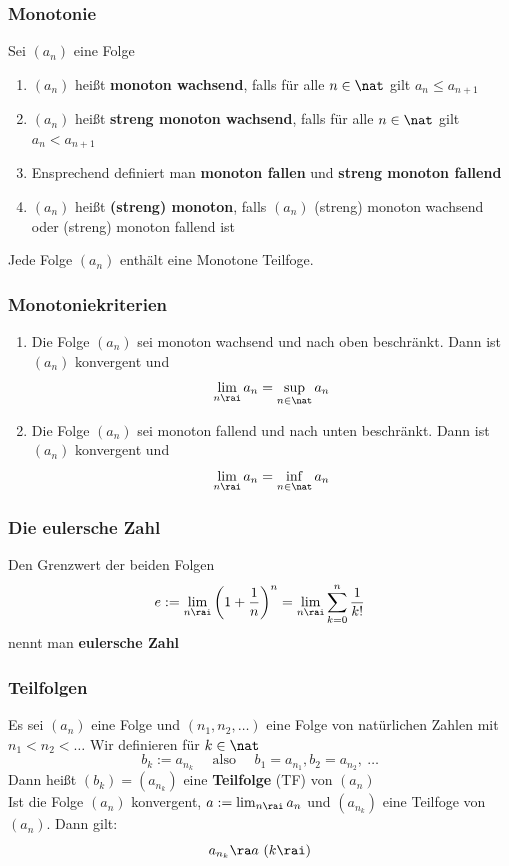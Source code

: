 \documentclass{kit}
\begin{document}
    \subsubsection{Monotonie}
      Sei $(a_n)$ eine Folge
      \begin{enumerate}
        \item $(a_n)$ heißt \textbf{monoton wachsend}, falls für alle $n\in\nat$ gilt $a_n\le a_{n+1}$
        \item $(a_n)$ heißt \textbf{streng monoton wachsend}, falls für alle $n\in\nat$ gilt $a_n<a_{n+1}$
        \item Ensprechend definiert man \textbf{monoton fallen} und \textbf{streng monoton fallend}
        \item $(a_n)$ heißt \textbf{(streng) monoton}, falls $(a_n)$ (streng) monoton wachsend oder (streng) monoton fallend ist
      \end{enumerate}
      Jede Folge $(a_n)$ enthält eine Monotone Teilfoge.
    \subsubsection{Monotoniekriterien}
      \begin{enumerate}
        \item Die Folge $(a_n)$ sei monoton wachsend und nach oben beschränkt. Dann ist $(a_n)$ konvergent und
          $$\lim_{n\rai}a_n=\sup_{n\in\nat}a_n$$
        \item Die Folge $(a_n)$ sei monoton fallend und nach unten beschränkt. Dann ist $(a_n)$ konvergent und
          $$\lim_{n\rai}a_n=\inf_{n\in\nat}a_n$$
      \end{enumerate}
    \subsubsection{Die eulersche Zahl}
      Den Grenzwert der beiden Folgen
      $$e:=\lim_{n\rai}\left(1+\frac{1}{n}\right)^n=\lim_{n\rai}\sum^n_{k=0}\frac{1}{k!}$$
      nennt man \textbf{eulersche Zahl}
    \subsubsection{Teilfolgen}
      Es sei $(a_n)$ eine Folge und $(n_1,n_2,\dots)$ eine Folge von natürlichen Zahlen mit $n_1<n_2<\dots$ Wir definieren für $k\in\nat$
      $$b_k:=a_{n_k}\quad \text{ also }\quad b_1=a_{n_1}, b_2=a_{n_2},\ \dots$$
      Dann heißt $(b_k)=(a_{n_k})$ eine \textbf{Teilfolge} (TF) von $(a_n)$\\
      Ist die Folge $(a_n)$ konvergent, $a:=\lim_{n\rai}a_n$ und $(a_{n_k})$ eine Teilfoge von $(a_n)$. Dann gilt:
      $$a_{n_k}\ra a\ (k\rai)$$
\end{document}
